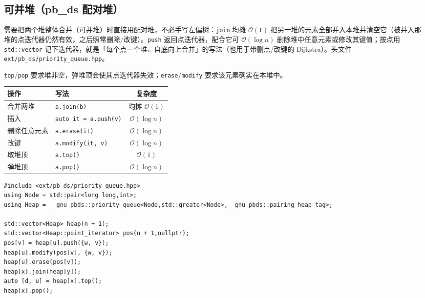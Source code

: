 \subsection{可并堆（pb\_ds 配对堆）}

需要把两个堆整体合并（可并堆）时直接用配对堆，不必手写左偏树：\texttt{join} 均摊 $\mathcal{O}(1)$ 把另一堆的元素全部并入本堆并清空它（被并入那堆的点迭代器仍然有效，之后照常删除/改键）。\texttt{push} 返回点迭代器，配合它可 $\mathcal{O}(\log n)$ 删除堆中任意元素或修改其键值；按点用 \texttt{std::vector} 记下迭代器，就是「每个点一个堆、自底向上合并」的写法（也用于带删点/改键的 Dijkstra）。头文件 \texttt{ext/pb\_ds/priority\_queue.hpp}。

\texttt{top}/\texttt{pop} 要求堆非空，弹堆顶会使其点迭代器失效；\texttt{erase}/\texttt{modify} 要求该元素确实在本堆中。

\begin{center}
\small
\begin{tabular}{lp{7cm}c}
\toprule
操作 & 写法 & 复杂度 \\
\midrule
合并两堆 & \texttt{a.join(b)} & 均摊 $\mathcal{O}(1)$ \\
插入 & \texttt{auto it = a.push(v)} & $\mathcal{O}(\log n)$ \\
删除任意元素 & \texttt{a.erase(it)} & $\mathcal{O}(\log n)$ \\
改键 & \texttt{a.modify(it, v)} & $\mathcal{O}(\log n)$ \\
取堆顶 & \texttt{a.top()} & $\mathcal{O}(1)$ \\
弹堆顶 & \texttt{a.pop()} & $\mathcal{O}(\log n)$ \\
\bottomrule
\end{tabular}
\end{center}

\begin{lstlisting}
#include <ext/pb_ds/priority_queue.hpp>
using Node = std::pair<long long,int>;
using Heap = __gnu_pbds::priority_queue<Node,std::greater<Node>,__gnu_pbds::pairing_heap_tag>;

std::vector<Heap> heap(n + 1);
std::vector<Heap::point_iterator> pos(n + 1,nullptr);
pos[v] = heap[u].push({w, v});
heap[u].modify(pos[v], {w, v});
heap[u].erase(pos[v]);
heap[x].join(heap[y]);
auto [d, u] = heap[x].top();
heap[x].pop();
\end{lstlisting}
